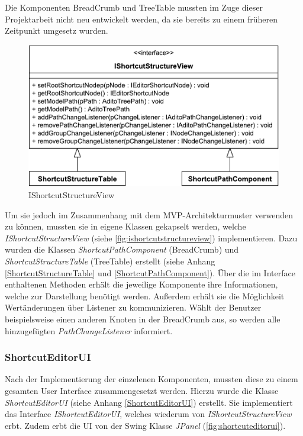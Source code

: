 Die Komponenten BreadCrumb und TreeTable mussten im Zuge dieser Projektarbeit nicht neu entwickelt werden, da sie bereits zu einem früheren Zeitpunkt umgesetz wurden. 

\begin{figure}
	\vspace{-12px}
	\centering
	\includegraphics[width=1\linewidth]{../graphic/diagrams/CD_IShortcutStructureView/IShortcutStructureView}
	\caption{IShortcutStructureView}
	\label{fig:ishortcutstructureview}
\end{figure}

Um sie jedoch im Zusammenhang mit dem MVP-Architekturmuster verwenden zu können, mussten sie in eigene Klassen gekapselt werden, welche \emph{IShortcutStructureView} (siehe \autoref{fig:ishortcutstructureview}) implementieren. Dazu wurden die Klassen \emph{ShortcutPathComponent} (BreadCrumb) und \emph{ShortcutStructureTable} (TreeTable) erstellt (siehe Anhang \ref{ShortcutStructureTable} und \ref{ShortcutPathComponent}). Über die im Interface enthaltenen Methoden erhält die jeweilige Komponente ihre Informationen, welche zur Darstellung benötigt werden. Außerdem erhält sie die Möglichkeit Wertänderungen über Listener zu kommunizieren. Wählt der Benutzer beispielsweise einen anderen Knoten in der BreadCrumb aus, so werden alle hinzugefügten \emph{PathChangeListener} informiert.


\subsubsection{ShortcutEditorUI}

Nach der Implementierung der einzelenen Komponenten, mussten diese zu einem gesamten User Interface zusammengesetzt werden. Hierzu wurde die Klasse \emph{ShortcutEditorUI} (siehe Anhang \ref{ShortcutEditorUI}) erstellt. Sie implementiert das Interface \emph{IShortcutEditorUI}, welches wiederum von \emph{IShortcutStructureView} erbt. Zudem erbt die UI von der Swing Klasse \emph{JPanel} (\autoref{fig:shortcuteditorui}).

